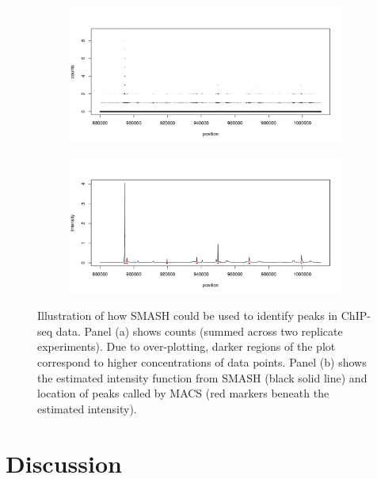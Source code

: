 \documentclass[12pt]{article}
\begin{document}
\begin{figure}[p]
\centering
    \begin{subfigure}[b]{0.85\textwidth}
        \centering
        \includegraphics[width=\textwidth]{peaks_comp_a.png}
        \caption{}
        \label{fig:seq_peak_data}
    \end{subfigure}
    \begin{subfigure}[b]{0.85\textwidth}
        \centering
        \includegraphics[width=\textwidth]{peaks_comp_b.pdf}
        \caption{}
        \label{fig:seq_peak_est}
    \end{subfigure}
    \caption{Illustration of how SMASH could be used to identify peaks in ChIP-seq data.  Panel (a) shows counts (summed across two replicate experiments). Due to over-plotting, darker regions of the plot correspond to higher concentrations of data points. Panel (b) shows the estimated intensity function from SMASH (black solid line) and location of peaks called by MACS (red markers beneath the estimated intensity).}
    \label{fig:seq_peak}
\end{figure}


\section{Discussion}
\end{document}
